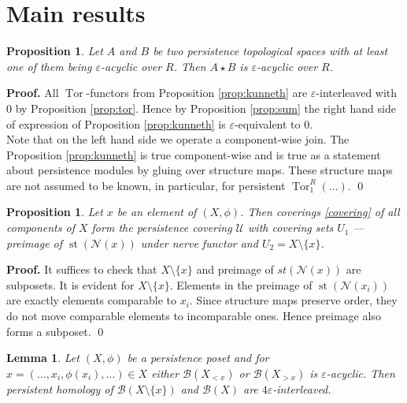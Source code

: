 \documentclass[english,12pt]{article}
\newcounter{stmcounter}[section]
\numberwithin{equation}{section}
\newtheorem{proposition}[stmcounter]{Proposition}
\newtheorem{lemma}[stmcounter]{Lemma}
\theoremstyle{definition}
\theoremstyle{remark}
\newenvironment{pf}{\noindent\textbf{Proof.}}{\qed}
\begin{document}
\section{Main results}

\begin{proposition}
  \label{prop:acyclic}
  Let $A$ and $B$ be two persistence topological spaces with at least one of them being $\varepsilon$-acyclic over $R$. Then $A \star B$ is $\varepsilon$-acyclic over $R$.
\end{proposition}

\begin{pf}
  All $\operatorname{Tor}$-functors from Proposition \ref{prop:kunneth} are $\varepsilon$-interleaved with $0$ by Proposition \ref{prop:tor}. Hence by Proposition \ref{prop:sum} the right hand side of expression of Proposition \ref{prop:kunneth} is $\varepsilon$-equivalent to $0$.\\
  
  Note that on the left hand side we operate a component-wise join. The Proposition \ref{prop:kunneth} is true component-wise and is true as a statement about persistence modules by gluing over structure maps. These structure maps are not assumed to be known, in particular, for persistent $\operatorname{Tor}_1^R(...)$.
\end{pf}\\

\begin{proposition}
  Let $x$ be an element of $(X,\phi)$. Then coverings \eqref{covering} of all components of $X$ form the persistence covering $\mathcal{U}$ with covering sets $U_1$ --- preimage of $\operatorname{st}(\mathcal{N}(x))$ under nerve functor and $U_2 = X \setminus \{x\}$.
\end{proposition}

\begin{pf}
  It suffices to check that $X \setminus \{x\}$ and preimage of $st(\mathcal{N}(x))$ are subposets.
  It is evident for $X \setminus \{x\}$. Elements in the preimage of $\operatorname{st}(\mathcal{N}(x_i))$ are exactly elements comparable to $x_i$. Since structure maps preserve order, they do not move comparable elements to incomparable ones. Hence preimage also forms a subposet.
\end{pf}\\

\begin{lemma}
  Let $(X,\phi)$ be a persistence poset and for $x=(\ldots,x_i,\phi(x_i),\ldots) \in X$ either $\mathcal{B}(X_{< x})$ or $\mathcal{B}(X_{> x})$ is $\varepsilon$-acyclic. Then persistent homology of $\mathcal{B}(X \setminus \{x\})$ and $\mathcal{B}(X)$ are $4\varepsilon$-interleaved.
\end{lemma}
\end{document}
